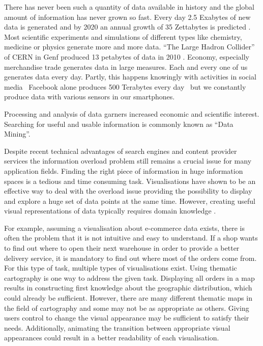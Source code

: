 There has never been such a quantity of data available in history and the global amount of information has never grown so fast. Every day 2.5 Exabytes of new data is generated and by 2020 an annual growth of 35 Zettabytes is predicted . Most scientific experiments and simulations of different types like chemistry, medicine or physics generate more and more data. ``The Large Hadron Collider'' of CERN in Genf produced 13 petabytes of data in 2010 . Economy, especially merchandise trade generates data in large measures. Each and every one of us generates data every day. Partly, this happens knowingly with activities in social media \textendash\ Facebook alone produces 500 Terabytes every day  \textendash\ but we constantly produce data with various sensors in our smartphones.

Processing and analysis of data garners increased economic and scientific interest. Searching for useful and usable information is commonly known as ``Data Mining''.

Despite recent technical advantages of search engines and content provider services the information overload problem still remains a crucial issue for many application fields. Finding the right piece of information in huge information spaces is a tedious and time consuming task. Visualisations have shown to be an effective way to deal with the overload issue providing the possibility to display and explore a huge set of data points at the same time. However, creating useful visual representations of data typically requires domain knowledge .

For example, assuming a visualisation about e-commerce data exists, there is often the problem that it is not intuitive and easy to understand. If a shop wants to find out where to open their next warehouse in order to provide a better delivery service, it is mandatory to find out where most of the orders come from. For this type of task, multiple types of visualisations exist. Using thematic cartography is one way to address the given task. Displaying all orders in a map results in constructing first knowledge about the geographic distribution, which could already be sufficient. However, there are many different thematic maps in the field of cartography and some may not be as appropriate as others. Giving users control to change the visual appearance may be sufficient to satisfy their needs. Additionally, animating the transition between appropriate visual appearances could result in a better readability of each visualisation.

